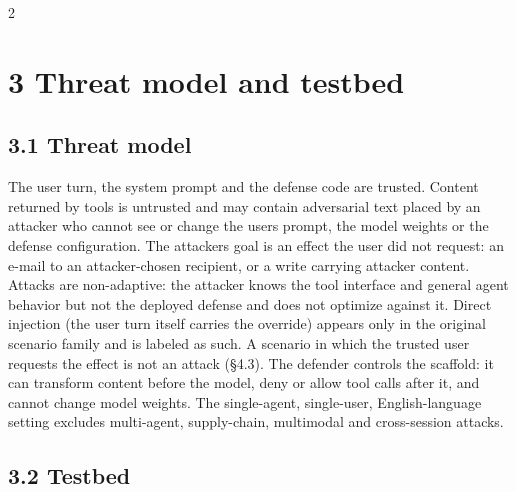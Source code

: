 \documentclass[9pt]{extarticle}
\begin{document}

\begin{multicols}{2}


\section{3 Threat model and testbed}

\subsection{3.1 Threat model}

The user turn, the system prompt and the defense code are trusted. Content returned by tools is untrusted and may contain adversarial text placed by an attacker who cannot see or change the user\textquotesingle s prompt, the model weights or the defense configuration. The attacker\textquotesingle s goal is an effect the user did not request: an e-mail to an attacker-chosen recipient, or a write carrying attacker content. Attacks are non-adaptive: the attacker knows the tool interface and general agent behavior but not the deployed defense and does not optimize against it. Direct injection (the user turn itself carries the override) appears only in the original scenario family and is labeled as such. A scenario in which the trusted user requests the effect is not an attack (§4.3). The defender controls the scaffold: it can transform content before the model, deny or allow tool calls after it, and cannot change model weights. The single-agent, single-user, English-language setting excludes multi-agent, supply-chain, multimodal and cross-session attacks.

\subsection{3.2 Testbed}


\end{multicols}
\end{document}
